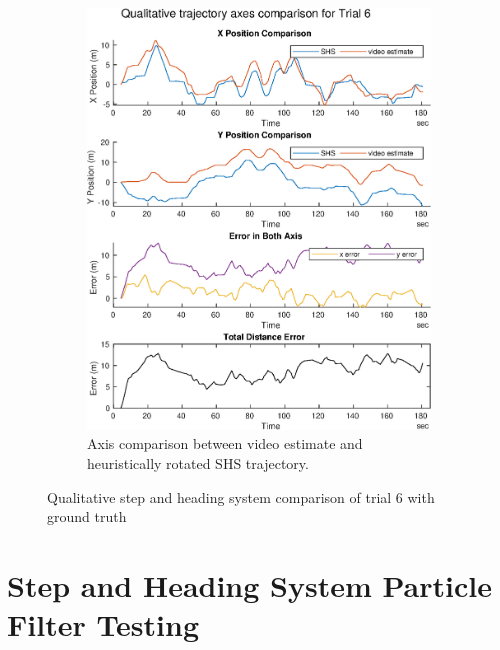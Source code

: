 \begin{figure}[H]
\begin{subfigure}[t]{.45\textwidth}
		\includegraphics[width=\linewidth]{images/20201201_2253_Qualitative_trajectory_axes_comparison_for_Trial_6_1}
		\caption{Axis comparison between video estimate and heuristically rotated SHS trajectory.}
		\label{fig:trial6_comparison}
	\end{subfigure}
\setlength{\belowcaptionskip}{-20pt}
	\caption{Qualitative step and heading system comparison of trial 6 with ground truth}
	\label{fig:trial6_shs_gt_comparison}
\end{figure}

\section[SHS-PF Testing]{Step and Heading System Particle Filter Testing}

